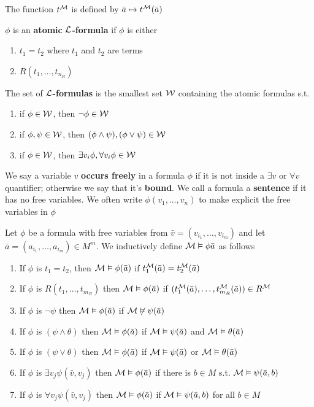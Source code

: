 \documentclass[11pt]{article}
\begin{document}
The function \(t^{\mathcal{M}}\) is defined by \(\bar{a}\mapsto t^{\mathcal{M}}(\bar{a})\)

\begin{definition}[]
\(\phi\) is an \textbf{atomic} \textbf{\(\mathcal{L}\)-formula} if \(\phi\) is either
\begin{enumerate}
\item \(t_1=t_2\) where \(t_1\) and \(t_2\) are terms
\item \(R(t_1,\dots,t_{n_R})\)
\end{enumerate}


The set of \textbf{\(\mathcal{L}\)-formulas} is the smallest set \(\mathcal{W}\) containing the
atomic formulas s.t.
\begin{enumerate}
\item if \(\phi\in\mathcal{W}\), then \(\neg\phi\in\mathcal{W}\)
\item if \(\phi,\psi\in\mathcal{W}\), then \((\phi\wedge\psi),(\phi\vee\psi)\in\mathcal{W}\)
\item if \(\phi\in\mathcal{W}\), then \(\exists v_i\phi,\forall v_i\phi\in\mathcal{W}\)
\end{enumerate}
\end{definition}

We say a variable \(v\) \textbf{occurs freely} in a formula \(\phi\) if it is not
inside a \(\exists v\) or \(\forall v\) quantifier; otherwise we say that it's
\textbf{bound}. We call a formula a \textbf{sentence} if it has no free variables. We
often write \(\phi(v_1,\dots,v_n)\) to make explicit the free variables in \(\phi\)

\begin{definition}[]
Let \(\phi\) be a formula with free variables from
\(\bar{v}=(v_{i_1},\dots,v_{i_m})\)
 and let
 \(\bar{a}=(a_{i_1},\dots,a_{i_m})\in M^m\). We inductively define
 \(\mathcal{M}\vDash\phi\bar{a}\) as follows
\begin{enumerate}
\item If \(\phi\) is \(t_1=t_2\), then \(\mathcal{M}\vDash\phi(\bar{a})\) if
\(t_1^{\mathcal{M}}(\bar{a})=t_2^{\mathcal{M}}(\bar{a})\)
\item If \(\phi\) is \(R(t_1,\dots,t_{m_R})\) then \(\mathcal{M}\vDash\phi(\bar{a})\) if
\((t_1^{\mathcal{M}}(\bar{a}),\dots,t_{m_R}^{\mathcal{M}}(\bar{a}))\in R^{\mathcal{M}}\)
\item If \(\phi\) is \(\neg\psi\) then \(\mathcal{M}\vDash\phi(\bar{a})\) if
\(\mathcal{M}\not\vDash\psi(\bar{a})\)
\item If \(\phi\) is \((\psi\wedge\theta)\) then \(\mathcal{M}\vDash\phi(\bar{a})\) if
\(\mathcal{M}\vDash\psi(\bar{a})\) and
\(\mathcal{M}\vDash\theta(\bar{a})\)
\item If \(\phi\) is \((\psi\vee\theta)\) then \(\mathcal{M}\vDash\phi(\bar{a})\) if
\(\mathcal{M}\vDash\psi(\bar{a})\) or
\(\mathcal{M}\vDash\theta(\bar{a})\)
\item If \(\phi\) is \(\exists v_j\psi(\bar{v},v_j)\) then \(\mathcal{M}\vDash\phi(\bar{a})\)
if there is \(b\in M\) s.t. \(\mathcal{M}\vDash\psi(\bar{a},b)\)
\item If \(\phi\) is \(\forall v_j\psi(\bar{v},v_j)\) then \(\mathcal{M}\vDash\phi(\bar{a})\)
if \(\mathcal{M}\vDash\psi(\bar{a},b)\) for all \(b\in M\)
\end{enumerate}
\end{definition}
\end{document}
